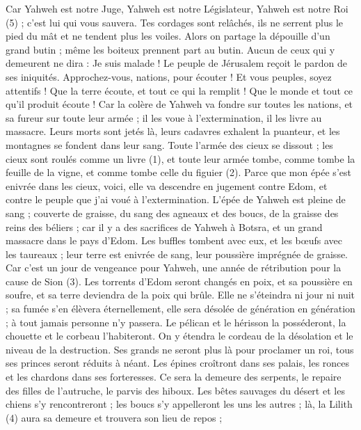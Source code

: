 \begin{multicols}{2}
Car Yahweh est notre Juge, Yahweh est notre Législateur, Yahweh est notre Roi (5) ; c'est lui qui vous sauvera.
Tes cordages sont relâchés, ils ne serrent plus le pied du mât et ne tendent plus les voiles. Alors on partage la dépouille d'un grand butin ; même les boiteux prennent part au butin.
Aucun de ceux qui y demeurent ne dira : Je suis malade ! Le peuple de Jérusalem reçoit le pardon de ses iniquités.
\VerseOne{}Approchez-vous, nations, pour écouter ! Et vous peuples, soyez attentifs ! Que la terre écoute, et tout ce qui la remplit ! Que le monde et tout ce qu’il produit écoute !
Car la colère de Yahweh va fondre sur toutes les nations, et sa fureur sur toute leur armée ; il les voue à l’extermination, il les livre au massacre.
Leurs morts sont jetés là, leurs cadavres exhalent la puanteur, et les montagnes se fondent dans leur sang.
Toute l'armée des cieux se dissout ; les cieux sont roulés comme un livre (1), et toute leur armée tombe, comme tombe la feuille de la vigne, et comme tombe celle du figuier (2).
Parce que mon épée s’est enivrée dans les cieux, voici, elle va descendre en jugement contre Edom, et contre le peuple que j'ai voué à l’extermination.
L'épée de Yahweh est pleine de sang ; couverte de graisse, du sang des agneaux et des boucs, de la graisse des reins des béliers ; car il y a des sacrifices de Yahweh à Botsra, et un grand massacre dans le pays d'Edom.
Les buffles tombent avec eux, et les bœufs avec les taureaux ; leur terre est enivrée de sang, leur poussière imprégnée de graisse.
Car c’est un jour de vengeance pour Yahweh, une année de rétribution pour la cause de Sion (3).
Les torrents d’Edom seront changés en poix, et sa poussière en soufre, et sa terre deviendra de la poix qui brûle.
Elle ne s’éteindra ni jour ni nuit ; sa fumée s’en élèvera éternellement, elle sera désolée de génération en génération ; à tout jamais personne n’y passera.
Le pélican et le hérisson la posséderont, la chouette et le corbeau l’habiteront. On y étendra le cordeau de la désolation et le niveau de la destruction.
Ses grands ne seront plus là pour proclamer un roi, tous ses princes seront réduits à néant.
Les épines croîtront dans ses palais, les ronces et les chardons dans ses forteresses. Ce sera la demeure des serpents, le repaire des filles de l’autruche, le parvis des hiboux.
Les bêtes sauvages du désert et les chiens s’y rencontreront ; les boucs s’y appelleront les uns les autres ; là, la Lilith (4) aura sa demeure et trouvera son lieu de repos ;

\end{multicols}
